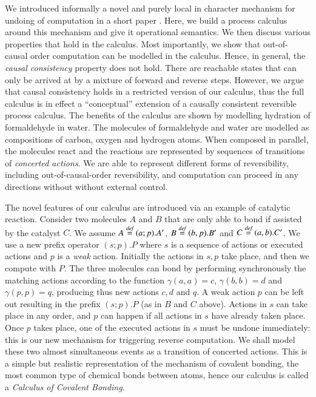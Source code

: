 \documentclass[preprint,12pt]{elsarticle}
\newcommand{\bydef}{\stackrel{\emph{def}}{=}}
\begin{document}
We introduced informally a novel and purely local in character mechanism for undoing
of computation in a short paper \cite{KU2015}. Here, we build a process calculus 
around this mechanism and give it operational semantics.
We then discuss various properties that hold in the calculus. Most importantly, 
we show that out-of-causal order computation can be modelled in the calculus. Hence, in general,
the \emph{causal consistency} property \cite{DK04} does not hold. There are reachable states 
that can only be arrived at by a mixture of forward and reverse steps. However, we argue that 
causal consistency holds in a restricted version of our calculus, thus the full calculus is in effect
a ``conceptual'' extension of a causally consistent reversible process calculus. The benefits
of the calculus are shown by modelling hydration of formaldehyde 
in water. The molecules of formaldehyde and water are modelled as compositions 
of carbon, oxygen and hydrogen atoms. When composed in parallel, the molecules react 
and the reactions are represented by sequences of transitions of \emph{concerted actions}. 
We are able to represent different forms of reversibility, including out-of-causal-order 
reversibility, and computation can proceed in any directions without without external control.

The novel features of our calculus are introduced via an example of catalytic reaction.
Consider two molecules $A$ and $B$ that are only able to bond if assisted by the catalyst $C$. 
We assume
	$A  \bydef  (a;p).A'$, $B  \bydef  (b,p).B'$ and $C \bydef  (a,b).C'$.
We use a new prefix operator $(s;p).P$ where $s$ is a sequence of actions or executed
actions and $p$ is a \emph{weak} action. Initially the actions in $s,p$ take place,
and then we compute with $P$.  The three molecules can bond by performing synchronously the
matching actions according to the function $\gamma(a,a)=c$, $\gamma(b,b)=d$ and
$\gamma(p,p)=q$, producing thus new actions $c,d$ and $q$. A weak action $p$ can be left out
resulting in the prefix $(s;p).P$ (as in $B$ and $C$ above).
Actions in $s$ can take place in any order, and $p$ can happen if
all actions in $s$ have already taken place. Once $p$ takes place, one of the executed
actions in $s$ must be undone immediately: this is our new mechanism for
triggering reverse computation.  We shall model these two almost simultaneous
events as a transition of concerted actions. This is
a simple but realistic representation of the mechanism of covalent bonding, 
the most common type of chemical bonds between atoms, hence our calculus is
called a \emph{Calculus of Covalent Bonding}.
\end{document}
